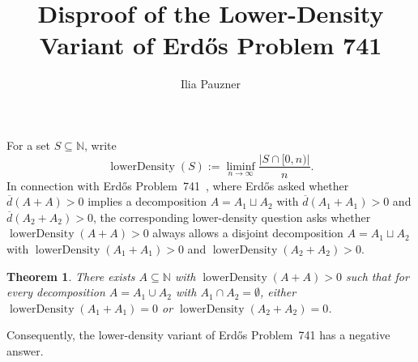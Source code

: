 \documentclass[11pt,a4paper]{amsart}
\title[Disproof of Erd\H{o}s Problem 741 (Lower Density)]{\texorpdfstring{Disproof of the Lower-Density Variant of Erd\H{o}s Problem 741}{Disproof of the Lower-Density Variant of Erdos Problem 741}}
\author{Ilia Pauzner}
\date{}
\newtheorem*{theorem}{Theorem}
\newcommand{\lowerDensity}{\operatorname{lowerDensity}}
\begin{document}
\maketitle

For a set $S \subseteq \mathbb{N}$, write
\[
\lowerDensity(S) := \liminf_{n \to \infty} \frac{|S \cap [0, n)|}{n}.
\]
In connection with Erd\H{o}s Problem~741~\cite{Er94b,EP741}, where Erd\H{o}s asked whether $\overline{d}(A + A) > 0$ implies a decomposition $A = A_1 \sqcup A_2$ with $\overline{d}(A_1 + A_1) > 0$ and $\overline{d}(A_2 + A_2) > 0$, the corresponding lower-density question asks whether $\lowerDensity(A + A) > 0$ always allows a disjoint decomposition $A = A_1 \sqcup A_2$ with $\lowerDensity(A_1 + A_1) > 0$ and $\lowerDensity(A_2 + A_2) > 0$.

\begin{theorem}
There exists $A \subseteq \mathbb{N}$ with $\lowerDensity(A + A) > 0$ such that for every decomposition $A = A_1 \cup A_2$ with $A_1 \cap A_2 = \emptyset$, either $\lowerDensity(A_1 + A_1) = 0$ or $\lowerDensity(A_2 + A_2) = 0$.
\end{theorem}

Consequently, the lower-density variant of Erd\H{o}s Problem~741 has a negative answer.
\end{document}
